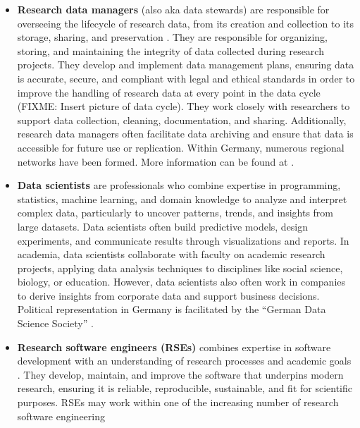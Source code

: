 \documentclass[
        english,biblatex
    ]{lni}
\begin{document}
    \begin{itemize}
    \item
      \textbf{Research data managers} (also aka data stewards) are
      responsible for overseeing the lifecycle of research data, from
      its creation and collection to its storage, sharing, and
      preservation \cite{https://doi.org/10.5281/zenodo.4915861}. They
      are responsible for organizing, storing, and maintaining the
      integrity of data collected during research projects. They develop
      and implement data management plans, ensuring data is accurate,
      secure, and compliant with legal and ethical standards in order to
      improve the handling of research data at every point in the data
      cycle (FIXME: Insert picture of data cycle). They work closely
      with researchers to support data collection, cleaning,
      documentation, and sharing. Additionally, research data managers
      often facilitate data archiving and ensure that data is accessible
      for future use or replication. Within Germany, numerous regional
      networks have been formed. More information can be found at
      \cite{fdminfo}.
    \item
      \textbf{Data scientists} are professionals who combine expertise
      in programming, statistics, machine learning, and domain knowledge
      to analyze and interpret complex data, particularly to uncover
      patterns, trends, and insights from large datasets. Data
      scientists often build predictive models, design experiments, and
      communicate results through visualizations and reports. In
      academia, data scientists collaborate with faculty on academic
      research projects, applying data analysis techniques to
      disciplines like social science, biology, or education. However,
      data scientists also often work in companies to derive insights
      from corporate data and support business decisions. Political
      representation in Germany is facilitated by the ``German Data
      Science Society'' \cite{gds}.
    \item
      \textbf{Research software engineers (RSEs)} combines expertise in
      software development with an understanding of research processes
      and academic goals \cite{https://doi.org/10.5281/zenodo.495360}.
      They develop, maintain, and improve the software that underpins
      modern research, ensuring it is reliable, reproducible,
      sustainable, and fit for scientific purposes. RSEs may work within
      one of the increasing number of research software engineering

\end{itemize}
\end{document}
